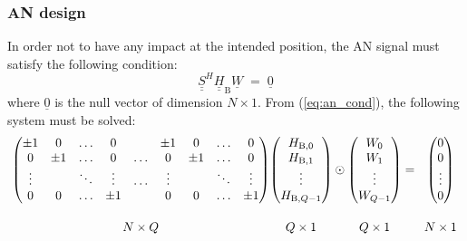 \documentclass[a4paper,11pt]{article}
\begin{document}
\subsubsection{AN design}
In order not to have any impact at the intended position, the AN signal must satisfy the following condition:
\begin{equation}
    \underline{\underline{S}}^H\underline{\underline{H}}_{\text{B}} \underline{W} \; = \; \underline{0}
    \label{eq:an_cond}
\end{equation}
where $\underline{0}$ is the null vector of dimension $N\times 1$. From (\ref{eq:an_cond}), the following system must be solved:
\begin{equation}
\resizebox{1.3\hsize}{!}{
    $
    \underset{\begin{array}{c}\\ N\times Q \end{array}}%
{%
    \begin{pmatrix}
    \pm 1 & 0 & \hdots & 0 & & \pm 1 & 0 & \hdots & 0  \\
    0 & \pm 1 & \hdots & 0 & \hdots & 0 & \pm 1 & \hdots & 0 \\
    \vdots & & \ddots & \vdots & \hdots & \vdots & & \ddots & \vdots \\
    0 & 0 & \hdots & \pm 1  & &0 & 0 & \hdots & \pm 1\\
    \end{pmatrix}
}
\underset{\begin{array}{c}\\ Q\times 1 \end{array}}%
{%
    \begin{pmatrix}
     H_{\text{B},0} \\
    H_{\text{B},1} \\
    \vdots \\
    H_{\text{B},Q-1}
    \end{pmatrix}
}
    \odot
\underset{\begin{array}{c}\\ Q\times 1 \end{array}}%
{%
    \begin{pmatrix}
    W_0 \\
    W_1 \\
    \vdots\\
    W_{Q-1}
    \end{pmatrix}
}
    = 
\underset{\begin{array}{c}\\ N\times 1 \end{array}}%
{%
    \begin{pmatrix}
    0\\
    0\\
    \vdots\\
    0
    \end{pmatrix}
}$}
    \label{eq:AN_generation}
\end{equation}
\end{document}
